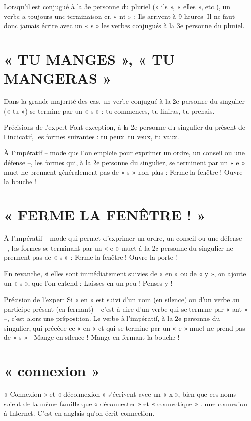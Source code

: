 Lorsqu'il est conjugué à la 3e personne du pluriel (« ils », « elles », etc.), un verbe a toujours une terminaison en « nt » : Ils arrivent à 9 heures.
Il ne faut donc jamais écrire avec un « s » les verbes conjugués à la 3e personne du pluriel.

\section{« TU MANGES », « TU MANGERAS »}

Dans la grande majorité des cas, un verbe conjugué à la 2e personne du singulier (« tu ») se termine par un « s » : tu commences, tu finiras, tu prenais.

Précisions de l'expert
Font exception, à la 2e personne du singulier du présent de l'indicatif, les formes suivantes : tu peux, tu veux, tu vaux.

À l'impératif – mode que l'on emploie pour exprimer un ordre, un conseil ou une défense –, les formes qui, à la 2e personne du singulier, se terminent par un « e » muet ne prennent généralement pas de « s » non plus : Ferme la fenêtre ! Ouvre la bouche !



\section{« FERME LA FENÊTRE ! »}

À l'impératif – mode qui permet d'exprimer un ordre, un conseil ou une défense –, les formes se terminant par un « e » muet à la 2e personne du singulier ne prennent pas de « s » : Ferme la fenêtre ! Ouvre la porte !

En revanche, si elles sont immédiatement suivies de « en » ou de « y », on ajoute un « s », que l'on entend : Laisses‑en un peu ! Penses‑y !

Précision de l'expert
Si « en » est suivi d'un nom (en silence) ou d'un verbe au participe présent (en fermant) – c'est‑à‑dire d'un verbe qui se termine par « ant » –, c'est alors une préposition. Le verbe à l'impératif, à la 2e personne du singulier, qui précède ce « en » et qui se termine par un « e » muet ne prend pas de « s » : Mange en silence ! Mange en fermant la bouche !


\section{« connexion »}

« Connexion » et « déconnexion » s'écrivent avec un « x », bien que ces noms soient de la même famille que « déconnecter » et « connectique » : une connexion à Internet.
C'est en anglais qu'on écrit connection.

